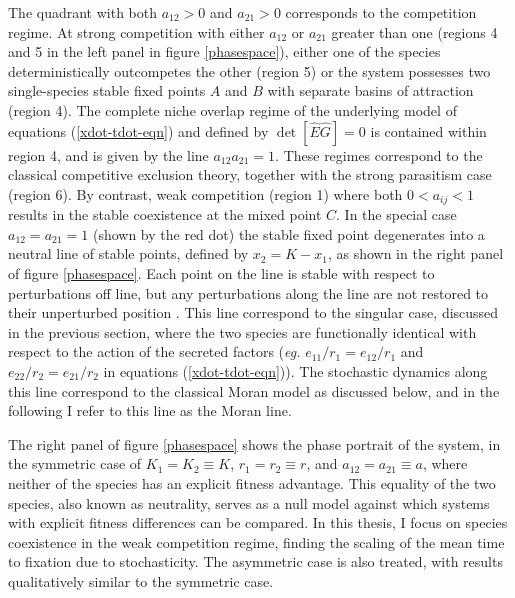The quadrant with both $a_{12}>0$ and $a_{21}>0$ corresponds to the competition regime. 
At strong competition with either $a_{12}$ or $a_{21}$ greater than one (regions 4 and 5 in the left panel in figure \ref{phasespace}), either one of the species deterministically outcompetes the other (region 5) or the system possesses two single-species stable fixed points $A$ and $B$ with separate basins of attraction (region 4). 
The complete niche overlap regime of the underlying model of equations (\ref{xdot-tdot-eqn}) and defined by $\det[\hat{E}\hat{G}]=0$ is contained within region 4, and is given by the line $a_{12}a_{21}=1$. 
These regimes correspond to the classical competitive exclusion theory, together with the strong parasitism case (region 6). %
By contrast, weak competition (region 1) where both $0<a_{ij}<1$ results in the stable coexistence at the mixed point $C$. 
In the special case $a_{12}=a_{21}=1$ (shown by the red dot) the stable fixed point degenerates into a neutral line of stable points, defined by $x_2 = K - x_1$, as shown in the right panel of figure \ref{phasespace}. 
Each point on the line is stable with respect to perturbations off line, but any perturbations along the line are not restored to their unperturbed position \cite{McGehee1977a,Case1979}. 
This line correspond to the singular case, discussed in the previous section, where the two species are functionally identical with respect to the action of the secreted factors (\emph{eg.} $e_{11}/r_1=e_{12}/r_1$ and $e_{22}/r_2=e_{21}/r_2$ in equations (\ref{xdot-tdot-eqn})). 
The stochastic dynamics along this line correspond to the classical Moran model as discussed below, and in the following I refer to this line as the Moran line.

The right panel of figure \ref{phasespace} shows the phase portrait of the system, in the symmetric case of $ K_1 = K_2\equiv K$, $r_1 = r_2\equiv r$, and $a_{12}=a_{21}\equiv a$, where neither of the species has an explicit fitness advantage. 
This equality of the two species, also known as neutrality, serves as a null model against which systems with explicit fitness differences can be compared. 
In this thesis, I focus on species coexistence in the weak competition regime, finding the scaling of the mean time to fixation due to stochasticity. %
The asymmetric case is also treated, with results qualitatively similar to the symmetric case. 

